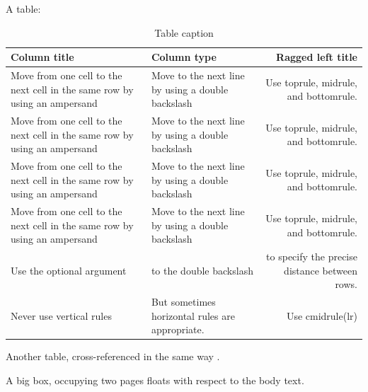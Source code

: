 \documentclass[embargoed]{grattan}
\begin{document}
A table:

\begin{table}
\caption{Table caption}\label{tbl:one-table}
\begin{tabularx}{\linewidth}{XXR}
%
\toprule
\textbf{Column title}                           & \textbf{Column type}                              & \textbf{Ragged left title} \\
\midrule
Move from one cell to the next cell in the same row by using an ampersand & Move to the next line by using a double backslash & Use toprule, midrule, and bottomrule. \\
Move from one cell to the next cell in the same row by using an ampersand & Move to the next line by using a double backslash & Use toprule, midrule, and bottomrule. \\
Move from one cell to the next cell in the same row by using an ampersand & Move to the next line by using a double backslash & Use toprule, midrule, and bottomrule. \\
Move from one cell to the next cell in the same row by using an ampersand & Move to the next line by using a double backslash & Use toprule, midrule, and bottomrule. \\[15.5pt]
Use the optional argument & to the double backslash & to specify the precise distance between rows. \\
\cmidrule(lr){2-3}
Never use vertical rules & But sometimes horizontal rules are appropriate. & Use cmidrule(lr) \\
\bottomrule
\end{tabularx}



\end{table}
Another table, cross-referenced in the same way .

A big box, occupying two pages floats with respect to the body text.
\end{document}
